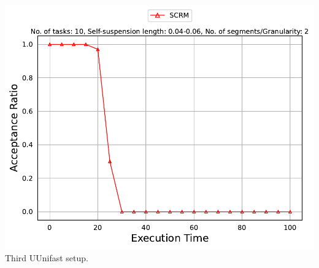 \documentclass[]{article}
\begin{document}
\begin{minipage}[t]{0.48\linewidth}
            \includegraphics[width=\linewidth]{SCRM[2][0.04-0.06][10].pdf}
		Third UUnifast setup.
		\vspace{0.3cm}
		
	\end{minipage}\hfill
\end{document}
